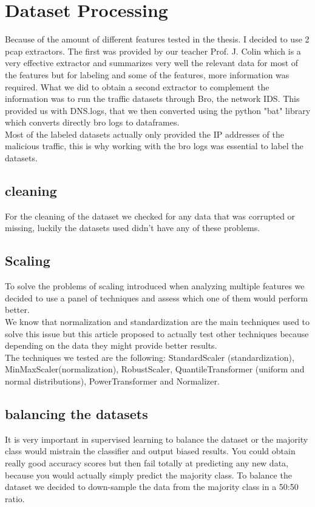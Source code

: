 \section{Dataset Processing}
Because of the amount of different features tested in the thesis. I decided to use 2 pcap extractors. The first was provided by our teacher Prof. J. Colin which is a very effective extractor and summarizes very well the relevant data for most of the features but for labeling and some of the features, more information was required. What we did to obtain a second extractor to complement the information was to run the traffic datasets through Bro, the network IDS. This provided us with DNS.logs, that we then converted using the python "bat" library which converts directly bro logs to dataframes.\\
Most of the labeled datasets actually only provided the IP addresses of the malicious traffic, this is why working with the bro logs was essential to label the datasets.
\subsection{cleaning}
For the cleaning of the dataset we checked for any data that was corrupted or missing, luckily the datasets used didn't have any of these problems. 
\subsection{Scaling}
To solve the problems of scaling introduced when analyzing multiple features we decided to use a panel of techniques and assess which one of them would perform better. \\
We know that normalization and standardization are the main techniques used to solve this issue but this article \cite{normstd} proposed to actually test other techniques because depending on the data they might provide better results. \\
The techniques we tested are the following: StandardScaler (standardization), MinMaxScaler(normalization), RobustScaler, QuantileTransformer (uniform and normal distributions), PowerTransformer and Normalizer.
\subsection{balancing the datasets}
It is very important in supervised learning to balance the dataset or the majority class would mistrain the classifier and output biased results. You could obtain really good accuracy scores but then fail totally at predicting any new data, because you would actually simply predict the majority class. To balance the dataset we decided to down-sample the data from the majority class in a 50:50 ratio.\\

